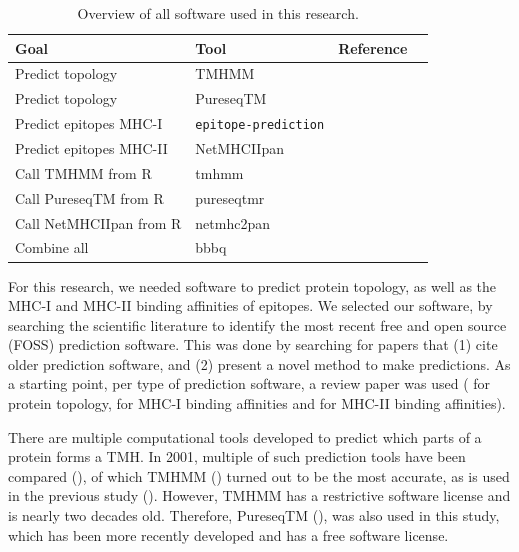 \begin{table}[]
  \begin{tabular}{llll}
    Goal & Tool & Reference \\ 
    \hline
    Predict topology                  & TMHMM                     & \cite{krogh2001predicting} \\
    Predict topology                  & PureseqTM                 & \cite{wang2019efficient} \\
    Predict epitopes MHC-I            & \verb;epitope-prediction; & \cite{bianchi2017} \\
    Predict epitopes MHC-II           & NetMHCIIpan               & \cite{nielsen2008quantitative,karosiene2013netmhciipan} \\
    Call TMHMM from R                 & tmhmm                     & \cite{tmhmm} \\
    Call PureseqTM from R             & pureseqtmr                & \cite{pureseqtmr} \\
    Call NetMHCIIpan from R           & netmhc2pan                & \cite{netmhc2pan} \\
    Combine all                       & bbbq                      & \cite{bbbq}
  \end{tabular}
  \caption{
    Overview of all software used in this research.
  }
  \label{table:software_used}
\end{table}


For this research, we needed software to predict protein
topology, as well as the MHC-I and MHC-II binding affinities
of epitopes. We selected our software, by
searching the scientific literature 
to identify the most recent free and open source (FOSS) 
prediction software.
This was done by searching for papers that (1) cite older
prediction software, and (2) present a novel method to make predictions.
As a starting point, per type of prediction software,
a review paper was used (\cite{moller2001evaluation} for protein
topology, \cite{lundegaard2011prediction} for MHC-I
binding affinities and \cite{nielsen2003reliable} for MHC-II binding
affinities). 


There are multiple computational tools developed to predict which
parts of a protein forms a TMH.
In 2001, multiple of such prediction tools have been compared (\cite{moller2001evaluation}),
of which TMHMM (\cite{krogh2001predicting}) turned out to be the most accurate, 
as is used in the previous study (\cite{bianchi2017}).
However, TMHMM has a restrictive software license and is nearly two
decades old.
Therefore, PureseqTM (\cite{wang2019efficient}),
was also used in this study, which has been more recently developed
and has a free software license.

